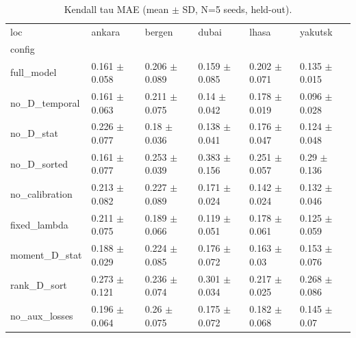 \begin{table}
\caption{Kendall tau MAE (mean $\pm$ SD, N=5 seeds, held-out).}
\label{tab:kendall_mae_v2}
\begin{tabular}{llllll}
\toprule
loc & ankara & bergen & dubai & lhasa & yakutsk \\
config &  &  &  &  &  \\
\midrule
full\_model & 0.161 $\pm$ 0.058 & 0.206 $\pm$ 0.089 & 0.159 $\pm$ 0.085 & 0.202 $\pm$ 0.071 & 0.135 $\pm$ 0.015 \\
no\_D\_temporal & 0.161 $\pm$ 0.063 & 0.211 $\pm$ 0.075 & 0.14 $\pm$ 0.042 & 0.178 $\pm$ 0.019 & 0.096 $\pm$ 0.028 \\
no\_D\_stat & 0.226 $\pm$ 0.077 & 0.18 $\pm$ 0.036 & 0.138 $\pm$ 0.041 & 0.176 $\pm$ 0.047 & 0.124 $\pm$ 0.048 \\
no\_D\_sorted & 0.161 $\pm$ 0.077 & 0.253 $\pm$ 0.039 & 0.383 $\pm$ 0.156 & 0.251 $\pm$ 0.057 & 0.29 $\pm$ 0.136 \\
no\_calibration & 0.213 $\pm$ 0.082 & 0.227 $\pm$ 0.089 & 0.171 $\pm$ 0.024 & 0.142 $\pm$ 0.024 & 0.132 $\pm$ 0.046 \\
fixed\_lambda & 0.211 $\pm$ 0.075 & 0.189 $\pm$ 0.066 & 0.119 $\pm$ 0.051 & 0.178 $\pm$ 0.061 & 0.125 $\pm$ 0.059 \\
moment\_D\_stat & 0.188 $\pm$ 0.029 & 0.224 $\pm$ 0.085 & 0.176 $\pm$ 0.072 & 0.163 $\pm$ 0.03 & 0.153 $\pm$ 0.076 \\
rank\_D\_sort & 0.273 $\pm$ 0.121 & 0.236 $\pm$ 0.074 & 0.301 $\pm$ 0.034 & 0.217 $\pm$ 0.025 & 0.268 $\pm$ 0.086 \\
no\_aux\_losses & 0.196 $\pm$ 0.064 & 0.26 $\pm$ 0.075 & 0.175 $\pm$ 0.072 & 0.182 $\pm$ 0.068 & 0.145 $\pm$ 0.07 \\
\bottomrule
\end{tabular}
\end{table}


